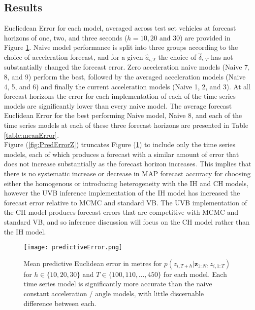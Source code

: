 \documentclass[12pt,a4paper]{article}\usepackage[]{graphicx}\usepackage[]{color}
\begin{document}
{\subsection{Results}
\label{subsec:Results}

Eucliedean Error for each model, averaged across test set vehicles at forecast horizons of one, two, and three seconds ($h = 10, 20$ and $30$) are provided in Figure \ref{fig:PredError}. Naive model performance is split into three groups according to the choice of acceleration forecast, and for a given $\hat{a}_{i, T}$ the choice of $\hat{\delta}_{i, T}$ has not substantially changed the forecast error. Zero acceleration naive models (Naive 7, 8, and 9) perform the best, followed by the averaged acceleration models (Naive 4, 5, and 6) and finally the current acceleration models (Naive 1, 2, and 3). At all forecast horizons the error for each implementation of each of the time series models are significantly lower than every naive model. The average forecast Euclidean Error for the best performing Naive model, Naive 8, and each of the time series models at each of these three forecast horizons are presented in Table \ref{table:meanError}.
\\

Figure (\ref{fig:PredErrorZ}) truncates Figure (\ref{fig:PredError}) to include only the time series models, each of which produces a forecast with a similar amount of error that does not increase substantially as the forecast horizon increases. This implies that there is no systematic increase or decrease in MAP forecast accuracy for choosing either the homogenous or introducing heterogeneity with the IH and CH models, however the UVB inference implementation of the IH model has increased the forecast error relative to MCMC and standard VB. The UVB implementation of the CH model produces forecast errors that are competitive with MCMC and standard VB, and so inference discussion will focus on the CH model rather than the IH model. 
\\

\begin{figure}[ht]
\centering
\texttt{[image: predictiveError.png]}
\caption{Mean predictive Euclidean error in metres for $p(z_{i, T+h} | \textbf{z}_{1:N}, z_{i, 1:T})$ for $h \in \{10, 20, 30\}$ and $T \in \{100, 110, \dots, 450\}$ for each model. Each time series model is significantly more accurate than the naive constant acceleration / angle models, with little discernable difference between each.}
\label{fig:PredError}
\end{figure}

}
\end{document}
